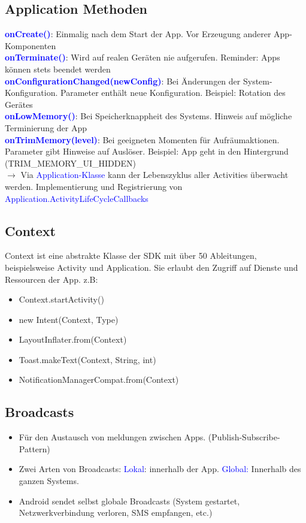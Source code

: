 \subsection{Application Methoden}
\textbf{\textcolor{blue}{onCreate()}}: Einmalig nach dem Start der App. Vor Erzeugung anderer App-Komponenten\\
\textbf{\textcolor{blue}{onTerminate()}}: Wird auf realen Geräten nie aufgerufen. Reminder: Apps können stets beendet werden\\
\textbf{\textcolor{blue}{onConfigurationChanged(newConfig)}}: Bei Änderungen der System-Konfiguration. Parameter enthält neue Konfiguration. Beispiel: Rotation des Gerätes\\
\textbf{\textcolor{blue}{onLowMemory()}}: Bei Speicherknappheit des Systems. Hinweis auf mögliche Terminierung der App\\
\textbf{\textcolor{blue}{onTrimMemory(level)}}: Bei geeigneten Momenten für Aufräumaktionen. Parameter gibt Hinweise auf Auslöser. Beispiel: App geht in den Hintergrund (TRIM\_MEMORY\_UI\_HIDDEN)\\
$\rightarrow$ Via \textcolor{blue}{Application-Klasse} kann der Lebenszyklus aller Activities überwacht werden. Implementierung und Registrierung von \textcolor{blue}{Application.ActivityLifeCycleCallbacks}
\subsection{Context}
Context ist eine abstrakte Klasse der SDK mit über 50 Ableitungen, beispielsweise Activity und Application. Sie erlaubt den Zugriff auf Dienste und Ressourcen der App. z.B:
\begin{itemize}[topsep=0pt, leftmargin=4mm]
    \setlength\itemsep{-0.3em}
    \item Context.startActivity()
    \item new Intent(Context, Type)
    \item LayoutInflater.from(Context)
    \item Toast.makeText(Context, String, int)
    \item NotificationManagerCompat.from(Context)
\end{itemize}
\subsection{Broadcasts}
\begin{itemize}[topsep=0pt, leftmargin=4mm]
    \setlength\itemsep{-0.3em}
    \item Für den Austausch von meldungen zwischen Apps. (Publish-Subscribe-Pattern)
    \item Zwei Arten von Broadcasts: \textcolor{blue}{Lokal}: innerhalb der App. \textcolor{blue}{Global:} Innerhalb des ganzen Systems.
    \item Android sendet selbst globale Broadcasts (System gestartet, Netzwerkverbindung verloren, SMS empfangen, etc.)
\end{itemize}
